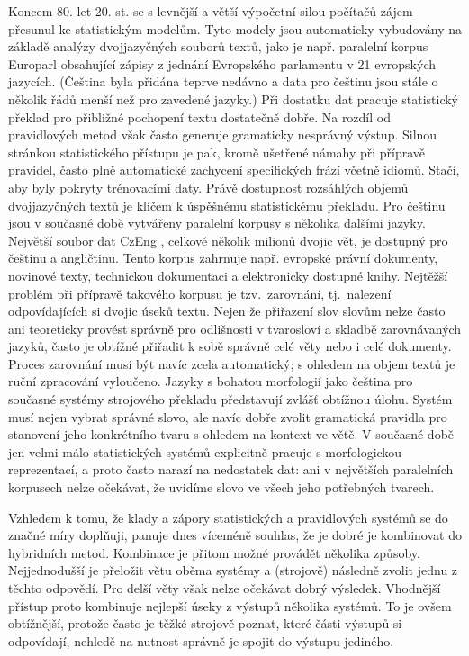 \begin{multicols}{2}
Koncem 80. let 20. st. se s levnější a větší výpočetní silou počítačů zájem přesunul ke statistickým modelům. Tyto modely jsou automaticky vybudovány na základě analýzy dvojjazyčných souborů textů, jako je např. paralelní korpus Europarl obsahující zápisy z jednání Evropského parlamentu v 21 evropských jazycích. (Čeština byla přidána teprve nedávno a data pro češtinu jsou stále o několik řádů menší než pro zavedené jazyky.) Při dostatku dat pracuje statistický překlad pro přibližné pochopení textu dostatečně dobře. Na rozdíl od pravidlových metod však často generuje gramaticky nesprávný výstup. Silnou stránkou statistického přístupu je pak, kromě ušetřené námahy při přípravě pravidel, často plně automatické zachycení specifických frází včetně idiomů. Stačí, aby byly pokryty trénovacími daty. Právě dostupnost rozsáhlých objemů dvojjazyčných textů je klíčem k úspěšnému statistickému překladu. Pro češtinu jsou v současné době vytvářeny paralelní korpusy s několika dalšími jazyky. Největší soubor dat CzEng \cite{Note20}, celkově několik milionů dvojic vět, je dostupný pro češtinu a angličtinu. Tento korpus zahrnuje např. evropské právní dokumenty, novinové texty, technickou dokumentaci a elektronicky dostupné knihy. Nejtěžší problém při přípravě takového korpusu je tzv.~zarovnání, tj.~nalezení odpovídajících si dvojic úseků textu. Nejen že přiřazení slov slovům nelze často ani teoreticky provést správně pro odlišnosti v tvarosloví a skladbě zarovnávaných jazyků, často je obtížné přiřadit k sobě správně celé věty nebo i celé dokumenty. Proces zarovnání musí být navíc zcela automatický; s ohledem na objem textů je ruční zpracování vyloučeno. Jazyky s bohatou morfologií jako čeština pro současné systémy strojového překladu představují zvlášť obtížnou úlohu. Systém musí nejen vybrat správné slovo, ale navíc dobře zvolit gramatická pravidla pro stanovení jeho konkrétního tvaru s ohledem na kontext ve větě. V současné době jen velmi málo statistických systémů explicitně pracuje s morfologickou reprezentací, a proto často narazí na nedostatek dat: ani v největších paralelních korpusech nelze očekávat, že uvidíme slovo ve všech jeho potřebných tvarech.

Vzhledem k tomu, že klady a zápory statistických a pravidlových systémů se do značné míry doplňuji, panuje dnes víceméně souhlas, že je dobré je kombinovat do hybridních metod. Kombinace je přitom možné provádět několika způsoby. Nejjednodušší je přeložit větu oběma systémy a (strojově) následně zvolit jednu z těchto odpovědí. Pro delší věty však nelze očekávat dobrý výsledek. Vhodnější přístup proto kombinuje nejlepší úseky z výstupů několika systémů. To je ovšem obtížnější, protože často je těžké strojově poznat, které části výstupů si odpovídají, nehledě na nutnost správně je spojit do výstupu jediného.


\end{multicols}
